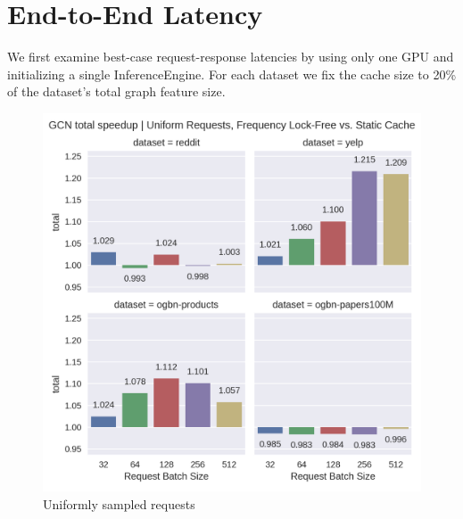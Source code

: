 \section{End-to-End Latency}
We first examine best-case request-response latencies by using only one GPU and initializing a single InferenceEngine. For each dataset we fix the cache size to 20\% of the dataset's total graph feature size.

\begin{figure}[h!]
    \begin{minipage}[c]{0.52\textwidth}
        \centering
        \includegraphics[width=\textwidth]{figures/speedup_GCN_total_uniform.png}
        \caption*{Uniformly sampled requests}
    \end{minipage}
    \hfill
    \begin{minipage}[c]{0.46\textwidth}
        \centering

\end{minipage}
\end{figure}
